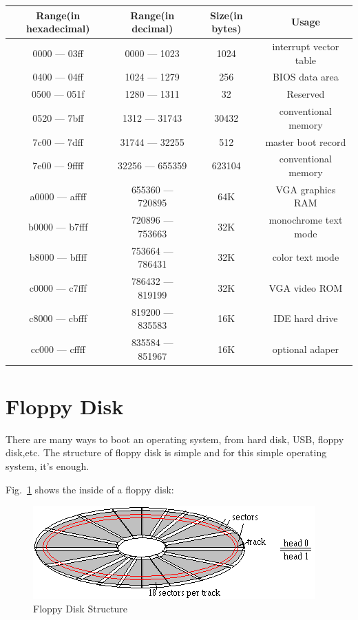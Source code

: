\documentclass{swfcthesis}
\begin{document}
\begin{center}
  \begin{tabular}{|c|c|c|c|} \hline
    Range(in hexadecimal) & Range(in decimal) & Size(in bytes) & Usage \\
    \hline
    0000 --- 03ff & 0000 --- 1023 & 1024 &  interrupt vector table \\
    \hline
    0400 --- 04ff & 1024 --- 1279 & 256 & BIOS data area \\
    \hline
    0500 --- 051f & 1280 --- 1311 & 32 & Reserved \\
    \hline
    0520 --- 7bff & 1312 --- 31743 & 30432 & conventional memory  \\
    \hline
    7c00 --- 7dff & 31744 --- 32255 & 512 & master boot record \\
    \hline
    7e00 --- 9ffff & 32256 --- 655359 & 623104 & conventional memory \\
    \hline
    a0000 --- affff & 655360 --- 720895 & 64K & VGA graphics RAM \\
    \hline
    b0000 --- b7fff & 720896 --- 753663 & 32K & monochrome text mode \\
    \hline
    b8000 --- bffff & 753664 --- 786431 & 32K & color text mode \\
    \hline
    c0000 --- c7fff & 786432 --- 819199 & 32K & VGA video ROM \\
    \hline
    c8000 --- cbfff & 819200 --- 835583 & 16K & IDE hard drive \\
    \hline
    cc000 --- cffff & 835584 --- 851967 & 16K & optional adaper \\
    
    \hline
  \end{tabular}
\end{center}

\section{Floppy Disk}
\label{sec:floppy-disk}

There are many ways to boot an operating system, from hard disk, USB, floppy disk,etc.
The structure of floppy disk is simple and for this simple operating
system, it's enough.

Fig.~\ref{fig:flpy1.png} shows the inside of a floppy disk:
\begin{figure}[!ht]
  \centering
  \includegraphics[width=.5\textwidth]{../figs/bootLoader/flpy1.png}
  \caption{Floppy Disk Structure}
  \label{fig:flpy1.png}
\end{figure}
\end{document}
